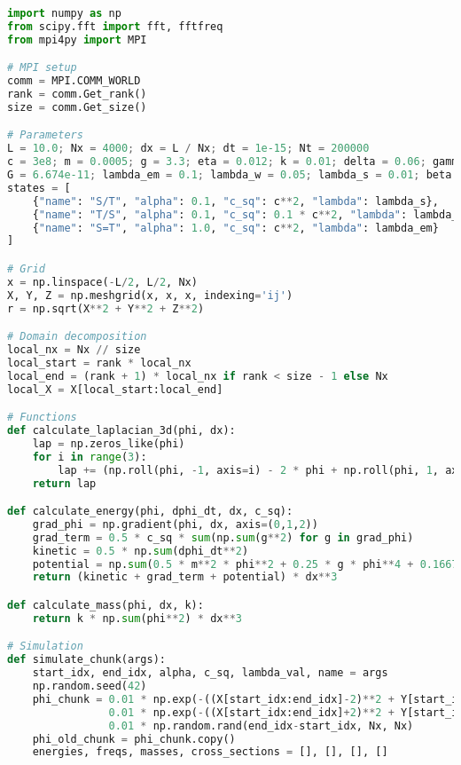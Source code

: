 \documentclass{article}
\begin{document}
\begin{lstlisting}[language=Python, caption=Ehokolon Force and Mass Simulation, label=lst:force]
import numpy as np
from scipy.fft import fft, fftfreq
from mpi4py import MPI

# MPI setup
comm = MPI.COMM_WORLD
rank = comm.Get_rank()
size = comm.Get_size()

# Parameters
L = 10.0; Nx = 4000; dx = L / Nx; dt = 1e-15; Nt = 200000
c = 3e8; m = 0.0005; g = 3.3; eta = 0.012; k = 0.01; delta = 0.06; gamma = 0.0225
G = 6.674e-11; lambda_em = 0.1; lambda_w = 0.05; lambda_s = 0.01; beta = 0.1; v = 1.0
states = [
    {"name": "S/T", "alpha": 0.1, "c_sq": c**2, "lambda": lambda_s},
    {"name": "T/S", "alpha": 0.1, "c_sq": 0.1 * c**2, "lambda": lambda_w},
    {"name": "S=T", "alpha": 1.0, "c_sq": c**2, "lambda": lambda_em}
]

# Grid
x = np.linspace(-L/2, L/2, Nx)
X, Y, Z = np.meshgrid(x, x, x, indexing='ij')
r = np.sqrt(X**2 + Y**2 + Z**2)

# Domain decomposition
local_nx = Nx // size
local_start = rank * local_nx
local_end = (rank + 1) * local_nx if rank < size - 1 else Nx
local_X = X[local_start:local_end]

# Functions
def calculate_laplacian_3d(phi, dx):
    lap = np.zeros_like(phi)
    for i in range(3):
        lap += (np.roll(phi, -1, axis=i) - 2 * phi + np.roll(phi, 1, axis=i)) / dx**2
    return lap

def calculate_energy(phi, dphi_dt, dx, c_sq):
    grad_phi = np.gradient(phi, dx, axis=(0,1,2))
    grad_term = 0.5 * c_sq * sum(np.sum(g**2) for g in grad_phi)
    kinetic = 0.5 * np.sum(dphi_dt**2)
    potential = np.sum(0.5 * m**2 * phi**2 + 0.25 * g * phi**4 + 0.1667 * eta * phi**6)
    return (kinetic + grad_term + potential) * dx**3

def calculate_mass(phi, dx, k):
    return k * np.sum(phi**2) * dx**3

# Simulation
def simulate_chunk(args):
    start_idx, end_idx, alpha, c_sq, lambda_val, name = args
    np.random.seed(42)
    phi_chunk = 0.01 * np.exp(-((X[start_idx:end_idx]-2)**2 + Y[start_idx:end_idx]**2 + Z[start_idx:end_idx]**2)/0.1**2) * np.cos(5*X[start_idx:end_idx]) + \
                0.01 * np.exp(-((X[start_idx:end_idx]+2)**2 + Y[start_idx:end_idx]**2 + Z[start_idx:end_idx]**2)/0.1**2) * np.cos(5*X[start_idx:end_idx]) + \
                0.01 * np.random.rand(end_idx-start_idx, Nx, Nx)
    phi_old_chunk = phi_chunk.copy()
    energies, freqs, masses, cross_sections = [], [], [], []
    

\end{lstlisting}
\end{document}

